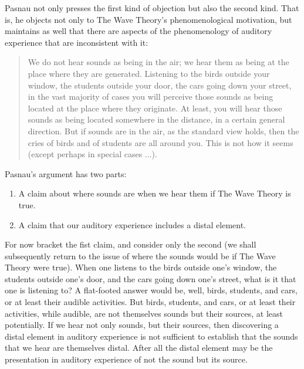 \documentclass[12pt]{article}
\begin{document}
Pasnau not only presses the first kind of objection but also the second kind. That is, he objects not only to The Wave Theory’s phenomenological motivation, but maintains as well that there are aspects of the phenomenology of auditory experience that are inconsistent with it:
\begin{quote}
	We do not hear sounds as being in the air; we hear them as being at the place where they are generated. Listening to the birds outside your window, the students outside your door, the cars going down your street, in the vast majority of cases you will perceive those sounds as being located at the place where they originate. At least, you will hear those sounds as being located somewhere in the distance, in a certain general direction. But if sounds are in the air, as the standard view holds, then the cries of birds and of students are all around you. This is not how it seems (except perhaps in special cases ...). 
\end{quote}

Pasnau's argument has two parts:
\begin{enumerate}[(1)]
	\item A claim about where sounds are when we hear them if The Wave Theory is true.
	\item A claim that our auditory experience includes a distal element.
\end{enumerate}
For now bracket the fist claim, and consider only the second (we shall subsequently return to the issue of where the sounds would be if The Wave Theory were true). When one listens to the birds outside one’s window, the students outside one’s door, and the cars going down one’s street, what is it that one is listening to? A flat-footed answer would be, well, birds, students, and cars, or at least their audible activities. But birds, students, and cars, or at least their activities, while audible, are not themselves sounds but their sources, at least potentially. If we hear not only sounds, but their sources, then discovering a distal element in auditory experience is not sufficient to establish that the sounds that we hear are themselves distal. After all the distal element may be the presentation in auditory experience of not the sound but its source.
\end{document}
